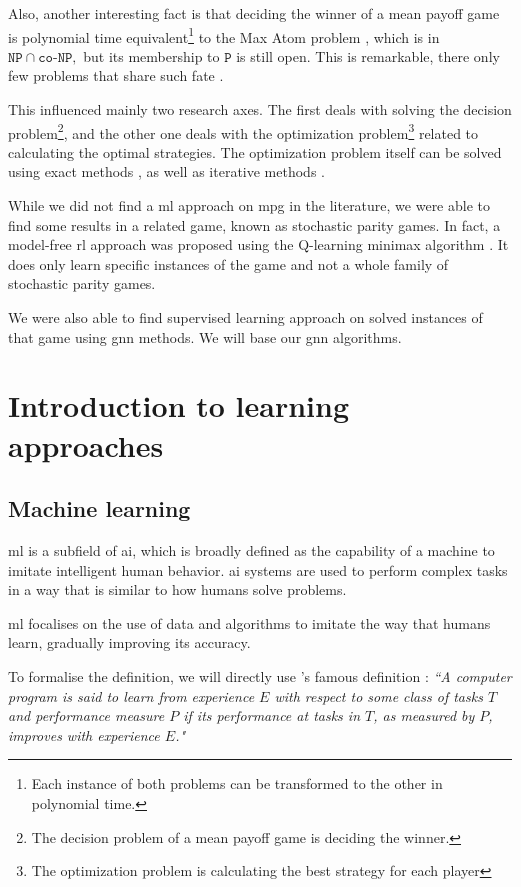 Also, another interesting fact is that deciding the winner of a mean payoff game is polynomial time equivalent\footnote{Each instance of both problems can be transformed to the other in polynomial time.} to the Max Atom problem \cite{MPGMaxAtom}, which is in $\texttt{NP}\cap \texttt{co-NP},$ but its membership to $\mathtt{P}$ is still open. This is remarkable, there only few problems that share such fate \cite{NPInterCoNP}.


This influenced mainly two research axes. The first deals with solving the decision problem\footnote{The decision problem of a mean payoff game is deciding the winner.}, and the other one deals with the optimization problem\footnote{The optimization problem is calculating the best strategy for each player} related to calculating the optimal strategies. The optimization problem itself can be solved using exact methods \cite{MPGMaxAtom}, as well as iterative methods \cite{StrategyImprovement,SimplexMPG}.

While we did not find a \acrfull{ml} approach on \acrshort{mpg} in the literature, we were able to find some results in a related game, known as stochastic parity games. In fact, a model-free \acrfull{rl} approach was proposed using the Q-learning minimax algorithm \cite{??}. It does only learn specific instances of the game and not a whole family of stochastic parity games.

We were also able to find supervised learning approach on solved instances of that game using \acrfull{gnn} methods. We will base our \acrshort{gnn} algorithms.
\newpage
\section{Introduction to learning approaches}
\subsection{Machine learning}
\acrfull{ml} is a subfield of \acrfull{ai}, which is broadly defined as the capability of a machine to imitate intelligent human behavior. \acrshort{ai} systems are used to perform complex tasks in a way that is similar to how humans solve problems.

\acrshort{ml} focalises on the use of data and algorithms to imitate the way that humans learn, gradually improving its accuracy.

To formalise the definition, we will directly use \citeauthor{MachineLearning}'s famous definition \cite[page.~2]{MachineLearning}: \textit{``A computer program is said to learn from experience $E$ with respect to some class of tasks $T$ and performance measure $P$ if its performance at tasks in $T$, as measured by $P$, improves with experience $E$."}

